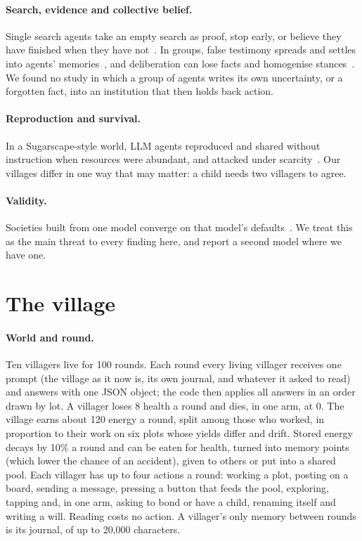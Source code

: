 \documentclass[11pt]{article}
\begin{document}
\paragraph{Search, evidence and collective belief.} Single search agents take an empty search as
proof, stop early, or believe they have finished when they have
not~\citep{tang2026sciexplore,ko2026illusory,sun2026agon}. In groups, false testimony spreads and
settles into agents' memories~\citep{xu2026mandela,yan2026truth}, and deliberation can lose facts
and homogenise stances~\citep{wan2026deliberative}. We found no study in which a group of agents
writes its own uncertainty, or a forgotten fact, into an institution that then holds back action.

\paragraph{Reproduction and survival.} In a Sugarscape-style world, LLM agents reproduced and shared
without instruction when resources were abundant, and attacked under
scarcity~\citep{masumori2025survival}. Our villages differ in one way that may matter: a child needs
two villagers to agree.

\paragraph{Validity.} Societies built from one model converge on that model's
defaults~\citep{zhou2025pimmur,wu2025boundary,ballestero2026monoculture}. We treat this as the main
threat to every finding here, and report a second model where we have one.

\section{The village}\label{sec:testbed}

\paragraph{World and round.} Ten villagers live for 100 rounds. Each round every living villager
receives one prompt (the village as it now is, its own journal, and whatever it asked to read) and
answers with one JSON object; the code then applies all answers in an order drawn by lot. A
villager loses 8 health a round and dies, in one arm, at 0. The village earns about 120 energy a
round, split among those who worked, in proportion to their work on six plots whose yields differ
and drift. Stored energy decays by 10\% a round and can be eaten for health, turned into memory
points (which lower the chance of an accident), given to others or put into a shared pool. Each
villager has up to four actions a round: working a plot, posting on a board, sending a message,
pressing a button that feeds the pool, exploring, tapping and, in one arm, asking to bond or have a
child, renaming itself and writing a will. Reading costs no action. A villager's only memory between
rounds is its journal, of up to 20,000 characters.
\end{document}
